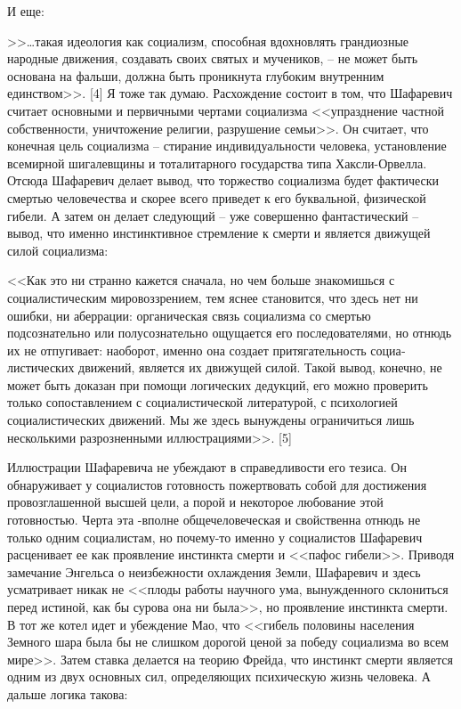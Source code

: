 \documentclass{book}
\begin{document}
И еще:

>>\ldots такая идеология как социализм, способная вдохновлять грандиозные народные движения, создавать своих святых и му­чеников, -- не может быть основана на фальши, должна быть проникнута глубоким внутренним единством>>. [4]
Я тоже так думаю. Расхождение состоит в том, что Шафаревич считает основными и первичными чертами социализма <<упразднение частной собственности, уничтожение религии, раз­рушение семьи>>. Он считает, что конечная цель социализма -- стирание индивидуальности человека, установление всемирной шигалевщины и тоталитарного государства типа Хаксли-Орвелла. Отсюда Шафаревич делает вывод, что торжество социализ­ма будет фактически смертью человечества и скорее всего при­ведет к его буквальной, физической гибели. А затем он делает следующий -- уже совершенно фантастический -- вывод, что именно инстинктивное стремление к смерти и является движу­щей силой социализма:

<<Как это ни странно кажется сначала, но чем больше знако­мишься с социалистическим мировоззрением, тем яснее стано­вится, что здесь нет ни ошибки, ни аберрации: органическая связь социализма со смертью подсознательно или полусозна­тельно ощущается его последователями, но отнюдь их не отпу­гивает: наоборот, именно она создает притягательность социа­листических движений, является их движущей силой. Такой вывод, конечно, не может быть доказан при помощи логиче­ских дедукций, его можно проверить только сопоставлением с социалистической литературой, с психологией социалисти­ческих движений. Мы же здесь вынуждены ограничиться лишь несколькими разрозненными иллюстрациями>>. [5]

Иллюстрации Шафаревича не убеждают в справедливости его тезиса. Он обнаруживает у социалистов готовность пожертво­вать собой для достижения провозглашенной высшей цели, а порой и некоторое любование этой готовностью. Черта эта -вполне общечеловеческая и свойственна отнюдь не только од­ним социалистам, но почему-то именно у социалистов Шафаревич расценивает ее как проявление инстинкта смерти и <<пафос гибели>>. Приводя замечание Энгельса о неизбежности охлажде­ния Земли, Шафаревич и здесь усматривает никак не <<плоды работы научного ума, вынужденного склониться перед истиной, как бы сурова она ни была>>, но проявление инстинкта смерти. В тот же котел идет и убеждение Мао, что <<гибель половины на­селения Земного шара была бы не слишком дорогой ценой за победу социализма во всем мире>>. Затем ставка делается на тео­рию Фрейда, что инстинкт смерти является одним из двух основ­ных сил, определяющих психическую жизнь человека. А даль­ше логика такова:
\end{document}
